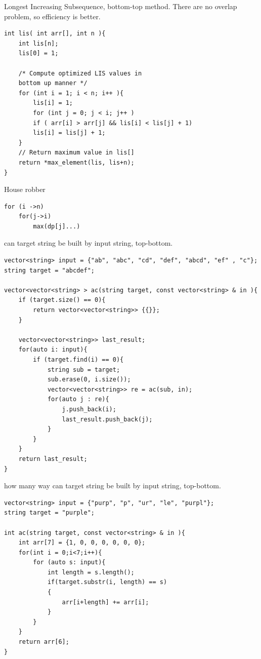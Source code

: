 \documentclass[a4paper,11pt,twoside]{book}
\begin{document}
	\par Longest Increasing Subsequence, bottom-top method. There are no overlap problem, so efficiency is better.
	
\begin{lstlisting}[numbers=none]
int lis( int arr[], int n ){
	int lis[n];
	lis[0] = 1;  
	
	/* Compute optimized LIS values in
	bottom up manner */
	for (int i = 1; i < n; i++ ){
		lis[i] = 1;
		for (int j = 0; j < i; j++ ) 
		if ( arr[i] > arr[j] && lis[i] < lis[j] + 1)
		lis[i] = lis[j] + 1;
	}
	// Return maximum value in lis[]
	return *max_element(lis, lis+n);
}	
\end{lstlisting}	
	
	
	\par House robber
\begin{lstlisting}[numbers=none]
for (i ->n)
	for(j->i)
		max(dp[j]...)
\end{lstlisting}	
	
	
	\par can target string be built by input string, top-bottom.
	
\begin{lstlisting}[numbers=none]
vector<string> input = {"ab", "abc", "cd", "def", "abcd", "ef" , "c"};
string target = "abcdef";

vector<vector<string> > ac(string target, const vector<string> & in ){
	if (target.size() == 0){
		return vector<vector<string>> {{}};
	}
	
	vector<vector<string>> last_result;
	for(auto i: input){
		if (target.find(i) == 0){
			string sub = target;
			sub.erase(0, i.size());
			vector<vector<string>> re = ac(sub, in);
			for(auto j : re){
				j.push_back(i);
				last_result.push_back(j);
			}
		}
	}
	return last_result;
}	
\end{lstlisting} 	
	
	\par how many way can target string be built by input string, top-bottom.
\begin{lstlisting}[numbers=none]
vector<string> input = {"purp", "p", "ur", "le", "purpl"};
string target = "purple";

int ac(string target, const vector<string> & in ){	
	int arr[7] = {1, 0, 0, 0, 0, 0, 0};
	for(int i = 0;i<7;i++){
		for (auto s: input){
			int length = s.length();
			if(target.substr(i, length) == s)
			{
				arr[i+length] += arr[i];
			}		
		}
	}	
	return arr[6];
}	
\end{lstlisting} 	
	
\end{document}
